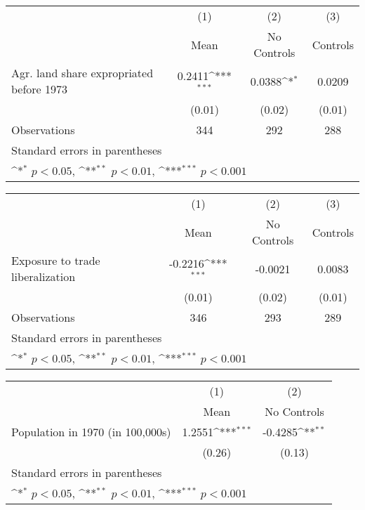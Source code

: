 {
\def\sym#1{\ifmmode^{#1}\else\(^{#1}\)\fi}
\begin{tabular}{l*{3}{c}}
\hline\hline
                    &\multicolumn{1}{c}{(1)}&\multicolumn{1}{c}{(2)}&\multicolumn{1}{c}{(3)}\\
                    &\multicolumn{1}{c}{Mean}&\multicolumn{1}{c}{No Controls}&\multicolumn{1}{c}{Controls}\\
\hline
Agr. land share expropriated before 1973&      0.2411\sym{***}&      0.0388\sym{*}  &      0.0209         \\
                    &      (0.01)         &      (0.02)         &      (0.01)         \\
\hline
Observations        &         344         &         292         &         288         \\
\hline\hline
\multicolumn{4}{l}{\footnotesize Standard errors in parentheses}\\
\multicolumn{4}{l}{\footnotesize \sym{*} \(p<0.05\), \sym{**} \(p<0.01\), \sym{***} \(p<0.001\)}\\
\end{tabular}
}
{
\def\sym#1{\ifmmode^{#1}\else\(^{#1}\)\fi}
\begin{tabular}{l*{3}{c}}
\hline\hline
                    &\multicolumn{1}{c}{(1)}&\multicolumn{1}{c}{(2)}&\multicolumn{1}{c}{(3)}\\
                    &\multicolumn{1}{c}{Mean}&\multicolumn{1}{c}{No Controls}&\multicolumn{1}{c}{Controls}\\
\hline
Exposure to trade liberalization&     -0.2216\sym{***}&     -0.0021         &      0.0083         \\
                    &      (0.01)         &      (0.02)         &      (0.01)         \\
\hline
Observations        &         346         &         293         &         289         \\
\hline\hline
\multicolumn{4}{l}{\footnotesize Standard errors in parentheses}\\
\multicolumn{4}{l}{\footnotesize \sym{*} \(p<0.05\), \sym{**} \(p<0.01\), \sym{***} \(p<0.001\)}\\
\end{tabular}
}
{
\def\sym#1{\ifmmode^{#1}\else\(^{#1}\)\fi}
\begin{tabular}{l*{2}{c}}
\hline\hline
                    &\multicolumn{1}{c}{(1)}&\multicolumn{1}{c}{(2)}\\
                    &\multicolumn{1}{c}{Mean}&\multicolumn{1}{c}{No Controls}\\
\hline
Population in 1970 (in 100,000s)&      1.2551\sym{***}&     -0.4285\sym{**} \\
                    &      (0.26)         &      (0.13)         \\
\hline\hline
\multicolumn{3}{l}{\footnotesize Standard errors in parentheses}\\
\multicolumn{3}{l}{\footnotesize \sym{*} \(p<0.05\), \sym{**} \(p<0.01\), \sym{***} \(p<0.001\)}\\
\end{tabular}
}
